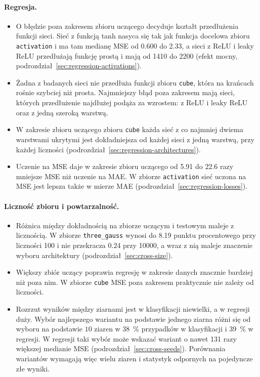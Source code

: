 \paragraph{Regresja.}
\begin{itemize}
    \item O błędzie poza zakresem zbioru uczącego decyduje kształt przedłużenia funkcji sieci. Sieć z funkcją tanh nasyca się tak jak funkcja docelowa zbioru \texttt{activation} i ma tam medianę MSE od \num{0.600} do \num{2.33}, a sieci z ReLU i leaky ReLU przedłużają funkcję prostą i mają od \num{1410} do \num{2200} (efekt mocny, podrozdział~\ref{sec:regression-activations}).
    \item Żadna z badanych sieci nie przedłuża funkcji zbioru \texttt{cube}, która na krańcach rośnie szybciej niż prosta. Najmniejszy błąd poza zakresem mają sieci, których przedłużenie najdłużej podąża za wzrostem: z ReLU i leaky ReLU oraz z jedną szeroką warstwą.
    \item W zakresie zbioru uczącego zbioru \texttt{cube} każda sieć z co najmniej dwiema warstwami ukrytymi jest dokładniejsza od każdej sieci z jedną warstwą, przy każdej liczności (podrozdział~\ref{sec:regression-architectures}).
    \item Uczenie na MSE daje w zakresie zbioru uczącego od \num{5.91} do \num{22.6} razy mniejsze MSE niż uczenie na MAE. W zbiorze \texttt{activation} sieć uczona na MSE jest lepsza także w mierze MAE (podrozdział~\ref{sec:regression-losses}).
\end{itemize}

\paragraph{Liczność zbioru i powtarzalność.}
\begin{itemize}
    \item Różnica między dokładnością na zbiorze uczącym i testowym maleje z licznością. W zbiorze \texttt{three\_gauss} wynosi do \num{8.19} punktu procentowego przy liczności \num{100} i nie przekracza \num{0.24} przy \num{10000}, a wraz z nią maleje znaczenie wyboru architektury (podrozdział~\ref{sec:cross-size}).
    \item Większy zbiór uczący poprawia regresję w zakresie danych znacznie bardziej niż poza nim. W zbiorze \texttt{cube} MSE poza zakresem praktycznie nie zależy od liczności.
    \item Rozrzut wyników między ziarnami jest w klasyfikacji niewielki, a w regresji duży. Wybór najlepszego wariantu na podstawie jednego ziarna różni się od wyboru na podstawie $10$ ziaren w \qty{38}{\percent} przypadków w klasyfikacji i \qty{39}{\percent} w regresji. W regresji taki wybór może wskazać wariant o nawet \num{131} razy większej medianie MSE (podrozdział~\ref{sec:cross-seeds}). Porównania wariantów wymagają więc wielu ziaren i statystyk odpornych na pojedyncze złe wyniki.
\end{itemize}

